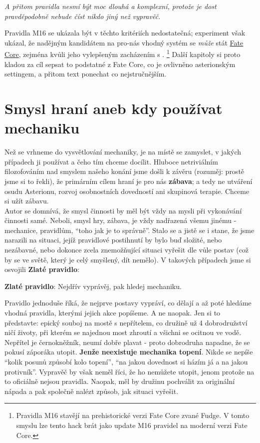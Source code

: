 \textit{A přitom pravidla nesmí být moc dlouhá a komplexní, protože je dost pravděpodobně nebude číst nikdo jiný než vypravěč.}

Pravidla M16 se ukázala být v těchto kritériích nedostatečná; experiment však ukázal, že nadějným kandidátem na pro-nás vhodný systém se \textit{může} stát \href{https://fate.nepocitacovehry.cz/?do=StahniFC}{Fate Core}, zejména kvůli jeho vylepšeným zacházením s . \footnote{Pravidla M16 stavějí na prehistorické verzi Fate Core zvané Fudge. V tomto smyslu lze tento hack brát jako update M16 pravidel na moderní verzi Fate Core.} Další kapitoly si proto kladou za cíl sepsat to podstatné z Fate Core, co je ovlivněno asterionským settingem, a přitom text ponechat co nejstručnějším. 

\section{Smysl hraní aneb kdy používat mechaniku}
\label{sec:proc}

Než se vrhneme do vysvětlování mechaniky, je na místě se zamyslet, v jakých případech ji používat a čeho tím chceme docílit. Hluboce netriviálním filozofováním nad smyslem našeho konání jsme došli k závěru (rozuměj: prostě jsme si to řekli), že primárním cílem hraní je pro nás \textbf{zábava}; a tedy ne utváření osudu Asterionu, rozvoj osobnostních dovedností ani skupinová terapie. Chceme si užít zábavu.\\

Autor se domnívá, že smysl činnosti by měl být vždy na mysli při vykonávání činnosti samé. Neboli, smysl hry, zábava, je vždy nadřazená všemu jinému - mechanice, pravidlům, ``toho jak je to správně''. Stalo se a jistě se i stane, že jsme narazili na situaci, jejíž pravidlové postihnutí by bylo buď složité, nebo nezábavné, nebo dokonce zcela znemožňující situaci vyřešit dle vůle postav (což by se ve světě, který je celý smyšlený, dít nemělo). V takových případech jsme si osvojili \textbf{Zlaté pravidlo}:

\begin{tcolorbox}
  \centering
  \textbf{Zlaté pravidlo}: Nejdřív vyprávěj, pak hledej mechaniku.
\end{tcolorbox}

Pravidlo jednoduše říká, že nejprve postavy vypráví, co dělají a až poté hledáme vhodná pravidla, kterými jejich akce popíšeme. A ne naopak. Jen si to představte: epický souboj na mostě s nepřítelem, co družině už 4 dobrodružství ničí životy, při kterém se najednou most zhroutí a všichni se ocitnou ve vodě. Nepřítel je černokněžník, neumí dobře plavat - proto dobrodruha napadne, že se pokusí záporáka utopit. \textbf{Jenže neexistuje mechanika topení}. Nikde se nepíše ``kolik posunů způsobí kolo topení'', ``na jakou dovednost si házím já a na jakou protivník''. Vypravěč by však neměl říci, že ho nemůžete utopit, jenom protože na to oficiálně nejsou pravidla. Naopak, měl by družinu pochválit za originální nápada a pak společně nalézt způsob, jak situaci vyřešit.\\

